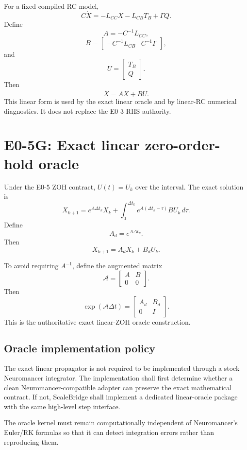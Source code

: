 \documentclass[11pt]{article}
\begin{document}
For a fixed compiled RC model,
\[
C\dot X=-L_{CC}X-L_{CB}T_B+\Gamma Q.
\]
Define
\[
\boxed{A=-C^{-1}L_{CC}},
\]
\[
\boxed{
B=
\begin{bmatrix}
-C^{-1}L_{CB}&C^{-1}\Gamma
\end{bmatrix},
}
\]
and
\[
U=\begin{bmatrix}T_B\\Q\end{bmatrix}.
\]
Then
\[
\boxed{\dot X=AX+BU.}
\]
This linear form is used by the exact linear oracle and by linear-RC numerical
diagnostics. It does not replace the E0-3 RHS authority.

\section{E0-5G: Exact linear zero-order-hold oracle}

Under the E0-5 ZOH contract, $U(t)=U_k$ over the interval. The exact solution is
\[
X_{k+1}
=e^{A\Delta t_k}X_k
+\int_0^{\Delta t_k}
 e^{A(\Delta t_k-\tau)}BU_k\,d\tau.
\]
Define
\[
A_d=e^{A\Delta t_k}.
\]
Then
\[
\boxed{X_{k+1}=A_dX_k+B_dU_k.}
\]

To avoid requiring $A^{-1}$, define the augmented matrix
\[
\mathcal A=
\begin{bmatrix}
A&B\\
0&0
\end{bmatrix}.
\]
Then
\[
\boxed{
\exp(\mathcal A\Delta t)
=
\begin{bmatrix}
A_d&B_d\\
0&I
\end{bmatrix}.
}
\]
This is the authoritative exact linear-ZOH oracle construction.

\subsection{Oracle implementation policy}
The exact linear propagator is not required to be implemented through a stock
Neuromancer integrator. The implementation shall first determine whether a
clean Neuromancer-compatible adapter can preserve the exact mathematical
contract. If not, ScaleBridge shall implement a dedicated linear-oracle package
with the same high-level step interface.

The oracle kernel must remain computationally independent of Neuromancer's
Euler/RK formulas so that it can detect integration errors rather than reproducing
them.
\end{document}
